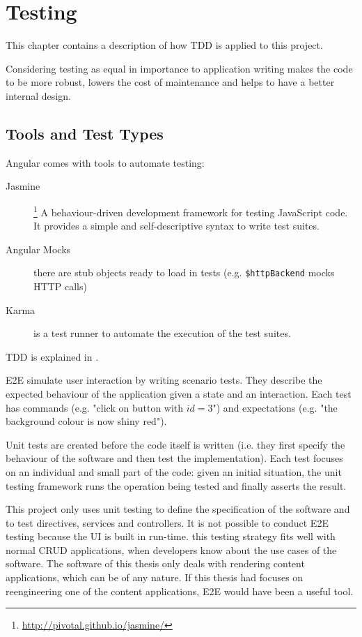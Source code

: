 \chapter{Testing}
\label{chap:testing}
This chapter contains a description of how \ac{TDD} is applied to this project.

Considering testing as equal in importance to application writing makes the code to be more robust, lowers the cost of maintenance and helps to have a better internal design.

\section{Tools and Test Types}
Angular comes with tools to automate testing:
\begin{description}
    \item[Jasmine]\footnote{\url{http://pivotal.github.io/jasmine/}} A behaviour-driven development framework for testing JavaScript code.
    It provides a simple and self-descriptive syntax to write test suites.
    \item[Angular Mocks] there are stub objects ready to load in tests (e.g. \texttt{\$httpBackend} mocks \ac{HTTP} calls)
    \item[Karma] is a test runner to automate the execution of the test suites. 
\end{description}

\ac{TDD} is explained in .

\ac{E2E} simulate user interaction by writing scenario tests.
They describe the expected behaviour of the application given a state and an interaction.
Each test has commands (e.g. "click on button with $id = 3$") and expectations (e.g. "the background colour is now shiny red").

Unit tests are created before the code itself is written (i.e. they first specify the behaviour of the software and then test the implementation).
Each test focuses on an individual and small part of the code: given an initial situation, the unit testing framework runs the operation being tested and finally asserts the result.

This project only uses unit testing to define the specification of the software and to test directives, services and controllers.
It is not possible to conduct \ac{E2E} testing because the \ac{UI} is built in run-time.
this testing strategy fits well with normal \ac{CRUD} applications, when developers know about the use cases of the software.
The software of this thesis only deals with rendering content applications, which can be of any nature.
If this thesis had focuses on reengineering one of the content applications, \ac{E2E} would have been a useful tool.

